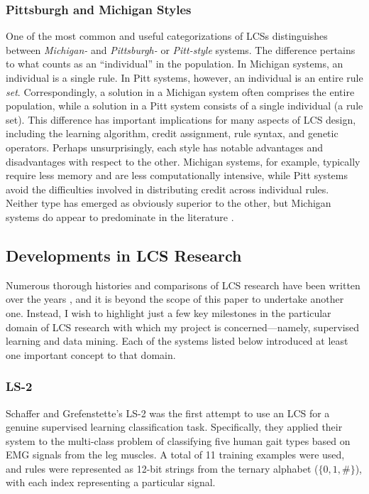 \documentclass[11pt]{article}
\begin{document}
\subsubsection{Pittsburgh and Michigan Styles}
One of the most common and useful categorizations of LCSs distinguishes between \emph{Michigan-} and \emph{Pittsburgh-} or \emph{Pitt-style} systems. The difference pertains to what counts as an ``individual'' in the population. In Michigan systems, an individual is a single rule. In Pitt systems, however, an individual is an entire rule \emph{set}. Correspondingly, a solution in a Michigan system often comprises the entire population, while a solution in a Pitt system consists of a single individual (a rule set). This difference has important implications for many aspects of LCS design, including the learning algorithm, credit assignment, rule syntax, and genetic operators. Perhaps unsurprisingly, each style has notable advantages and disadvantages with respect to the other. Michigan systems, for example, typically require less memory and are less computationally intensive, while Pitt systems avoid the difficulties involved in distributing credit across individual rules. Neither type has emerged as obviously superior to the other, but Michigan systems do appear to predominate in the literature \cite{urbanowicz_learning_2009}.

\subsection{Developments in LCS Research}

Numerous thorough histories and comparisons of LCS research have been written over the years \cite{urbanowicz_learning_2009, lanzi_roadmap_2000, wilson_critical_1989, wilson_state_2000}, and it is beyond the scope of this paper to undertake another one. Instead, I wish to highlight just a few key milestones in the particular domain of LCS research with which my project is concerned---namely, supervised learning and data mining. Each of the systems listed below introduced at least one important concept to that domain.

\subsubsection{LS-2}

Schaffer and Grefenstette's LS-2 \cite{schaffer_multi-objective_1985} was the first attempt to use an LCS for a genuine supervised learning classification task. Specifically, they applied their system to the multi-class problem of classifying five human gait types based on EMG signals from the leg muscles. A total of 11 training examples were used, and rules were represented as 12-bit strings from the ternary alphabet ($\{0,1,\#\}$), with each index representing a particular signal.
\end{document}
